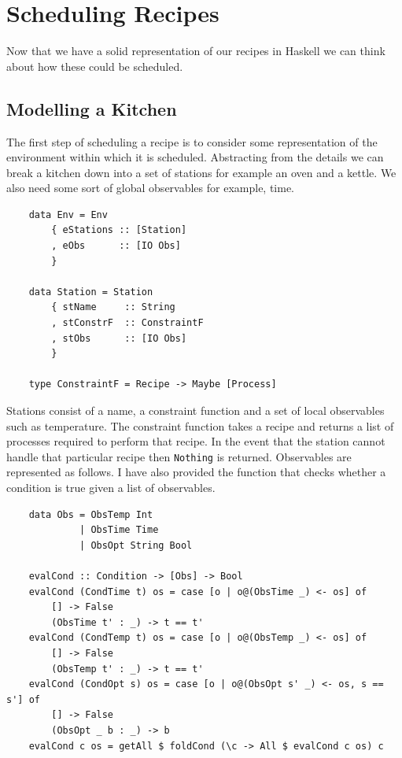 \documentclass[11pt]{article}
\begin{document}
\section{Scheduling Recipes}

Now that we have a solid representation of our recipes in Haskell we can think about how
these could be scheduled.

\subsection{Modelling a Kitchen}

The first step of scheduling a recipe is to consider some representation of the
environment within which it is scheduled. Abstracting from the details we can
break a kitchen down into a set of stations for example an oven and a kettle.
We also need some sort of global observables for example, time.

\begin{lstlisting}
    data Env = Env
        { eStations :: [Station]
        , eObs      :: [IO Obs]
        }

    data Station = Station
        { stName     :: String
        , stConstrF  :: ConstraintF
        , stObs      :: [IO Obs]
        }

    type ConstraintF = Recipe -> Maybe [Process]
\end{lstlisting}

Stations consist of a name, a constraint function and a set of local observables such as temperature.
The constraint function takes a recipe and returns a list of processes required to perform that recipe.
In the event that the station cannot handle that particular recipe then \texttt{Nothing} is returned.
Observables are represented as follows. I have also provided the function that checks whether a
condition is true given a list of observables.

\begin{lstlisting}
    data Obs = ObsTemp Int
             | ObsTime Time
             | ObsOpt String Bool

    evalCond :: Condition -> [Obs] -> Bool
    evalCond (CondTime t) os = case [o | o@(ObsTime _) <- os] of
        [] -> False
        (ObsTime t' : _) -> t == t'
    evalCond (CondTemp t) os = case [o | o@(ObsTemp _) <- os] of
        [] -> False
        (ObsTemp t' : _) -> t == t'
    evalCond (CondOpt s) os = case [o | o@(ObsOpt s' _) <- os, s == s'] of
        [] -> False
        (ObsOpt _ b : _) -> b
    evalCond c os = getAll $ foldCond (\c -> All $ evalCond c os) c
\end{lstlisting}
\end{document}
